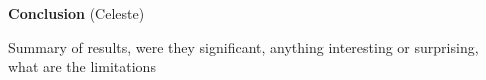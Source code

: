 \textbf{Conclusion} (Celeste)

Summary of results, were they significant, anything interesting or surprising, what are the limitations
    